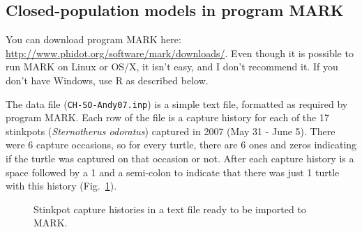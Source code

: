 \documentclass[12pt]{article}\usepackage[]{graphicx}\usepackage[]{color}
\begin{document}
\subsection*{Closed-population models in program MARK}

You can download program MARK here:
\url{http://www.phidot.org/software/mark/downloads/}. Even though it
is possible to run MARK on Linux or OS/X, it isn't easy, and I don't
recommend it. If you don't have Windows, use R as described below.

The data file (\verb+CH-SO-Andy07.inp+) is a simple text file, formatted
as required by program MARK. Each row of the file is a capture history
for each of the 17 stinkpots ({\it Sternotherus odoratus}) captured in
2007 (May 31 - June 5). There were 6 capture occasions, so for every
turtle, there are 6 ones and zeros indicating if the turtle was
captured on that occasion or not. After each capture history is a
space followed by a 1 and a semi-colon to indicate that there was just
1 turtle with this history (Fig.~\ref{fig:stink07-data}).

\begin{figure}[h!]
  \centering
  \caption{\small Stinkpot capture histories in a text file ready to
    be imported to MARK.}
  \label{fig:stink07-data}
\end{figure}
\end{document}
